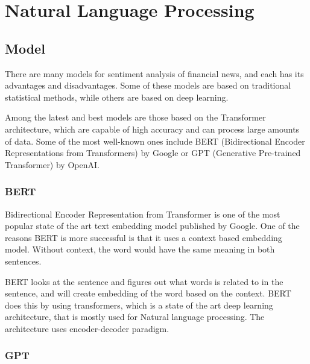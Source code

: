 \chapter{Natural Language Processing}
\label{chap:natural-language-processing}

\section{Model}
\label{sec:model}
There are many models for sentiment analysis of financial news, and each has its advantages and disadvantages. Some of these models are based on traditional statistical methods, while others are based on deep learning.

Among the latest and best models are those based on the Transformer architecture, which are capable of high accuracy and can process large amounts of data. Some of the most well-known ones include BERT (Bidirectional Encoder Representations from Transformers) by Google or GPT (Generative Pre-trained Transformer) by OpenAI.

\subsection{BERT}
\label{sec:bert}
Bidirectional Encoder Representation from Transformer is one of the most popular state of the art text embedding model published by Google. One of the reasons BERT is more successful is that it uses a context based embedding model. Without context, the word would have the same meaning in both sentences. 

BERT looks at the sentence and figures out what words is related to in the sentence, and will create embedding of the word based on the context. BERT does this by using transformers, which is a state of the art deep learning architecture, that is mostly used for Natural language processing. The architecture uses encoder-decoder paradigm.

\subsection{GPT}
\label{sec:gpt}

